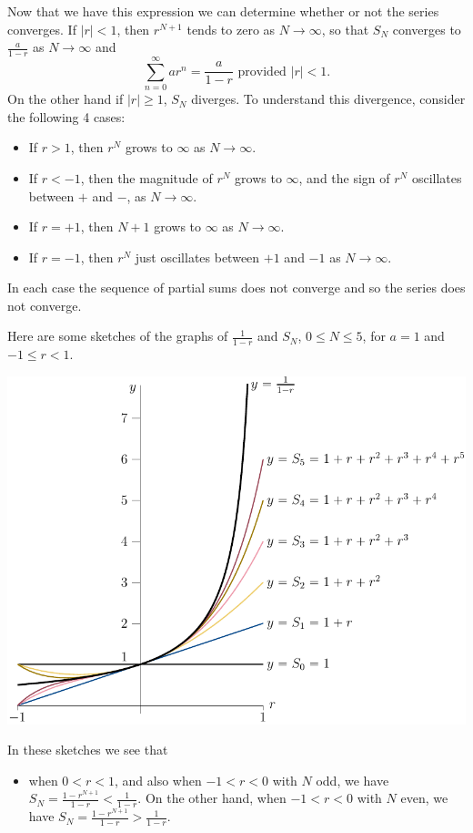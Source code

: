 \begin{eg}
Now that we have this expression we can determine whether or not the
series converges. If $|r|<1$, then $r^{N+1}$
tends to zero as $N\rightarrow\infty$, so that $S_N$  converges to $\frac{a}{1-r}$ as $N\rightarrow\infty$ and
\begin{equation}
\sum_{n=0}^\infty ar^n = \frac{a}{1-r}
\text{ provided $|r|<1$}. \label{eq:geomsum}
\end{equation}
On the other hand if $|r|\ge 1$, $S_N$ diverges.
To understand this divergence, consider the following 4 cases:
\begin{itemize}
\item If $r>1$, then $r^N$ grows to $\infty$ as $N\rightarrow\infty$.
\item If $r<-1$, then the magnitude of $r^N$ grows to $\infty$, and the sign of $r^N$ oscillates between $+$ and $-$,
as $N\rightarrow\infty$.
\item If $r=+1$, then $N+1$ grows to $\infty$ as $N\rightarrow\infty$.
\item If $r=-1$, then $r^N$ just oscillates between $+1$ and $-1$ as $N\rightarrow\infty$.
\end{itemize}
In each case the sequence of partial sums does not converge and so the series does not converge.

Here are some sketches of the graphs of $\frac{1}{1-r}$ and $S_N$,
$0\le N\le 5$, for $a=1$ and $-1\le r<1$.
\begin{efig}
\begin{center}
     \includegraphics[scale=0.95]{geomT.pdf}
\end{center}
\end{efig}
In these sketches we see that 
\begin{itemize}
\item
when $0< r<1$, and also when $-1<r<0$ with $N$ odd, we have $S_N=\frac{1-r^{N+1}}{1-r}<\frac{1}{1-r}$. On the other hand, when 
$-1<r<0$ with $N$ even, we have $S_N=\frac{1-r^{N+1}}{1-r}>\frac{1}{1-r}$.


\end{itemize}
\end{eg}
